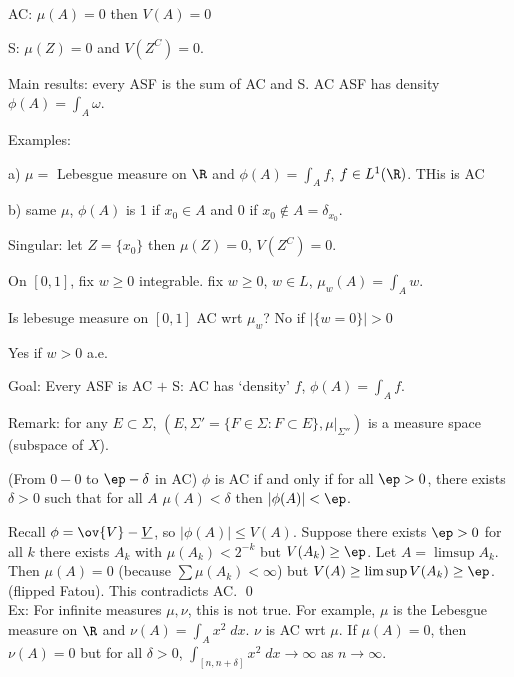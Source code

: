 AC: $\mu(A)=0$ then $V(A)=0$

S: $\mu(Z)=0$ and $V(Z^C)=0$.

Main results: every ASF is the sum of AC and S. AC ASF has density $\phi(A)= \int_A \omega$.

Examples:

a) $\mu=$ Lebesgue measure on $\R$ and $\phi(A)= \int_A f$, $f \in L^1(\R)$. THis is AC

b) same $\mu$, $\phi(A)$ is 1 if $x_0 \in A$ and $0$ if $x_0 \notin A= \delta_{x_0}$. 

Singular: let $Z= \{x_0\}$ then $\mu(Z)=0$, $V(Z^C)=0$. 


On $[0,1]$, fix $w \geq 0$ integrable. 
fix $w \geq 0$, $w \in L$, $\mu_w(A) = \int_A w$.

Is lebesuge measure on $[0,1]$ AC wrt $\mu_w$? No if $|\{w=0\}|>0$ 

Yes if $w>0$ a.e.






Goal: Every ASF is AC $+$ S: AC has `density' $f$, $\phi(A)= \int_A f$. 



Remark: for any $E \subset \Sigma$, $(E, \Sigma'= \{F \in \Sigma \colon F \subset E\}, \mu \big|_{\Sigma''})$ is a measure space (subspace of $X$). 


\begin{thm}
(From $0-0$ to $\ep-\delta$ in AC) $\phi$ is AC if and only if for all $\ep>0$, there exists $\delta>0$ such that for all $A$ $\mu(A)<\delta$ then $|\phi(A)|<\ep$.
\end{thm}

\pf Recall $\phi= \ov{V} - \underline{V}$, so $|\phi(A)| \leq V(A)$. Suppose there exists $\ep>0$ for all $k$ there exists $A_k$ with $\mu(A_k)< 2^{-k}$ but $V(A_k) \geq \ep$. Let $A= \limsup A_k$. Then $\mu(A)=0$ (because $\sum \mu(A_k)< \infty$) but $V(A) \geq \limsup V(A_k) \geq \ep$. (flipped Fatou). This contradicts AC. \qed \\


Ex: For infinite measures $\mu, \nu$, this is not true. For example, $\mu$ is the Lebesgue measure on $\R$ and $\nu(A) = \int_A x^2 \; dx$. $\nu$ is AC wrt $\mu$. If $\mu(A)=0$, then $\nu(A)=0$ but for all $\delta>0$, $\int_{[n,n+\delta]} x^2 \; dx \to \infty$ as $n \to \infty$. 


